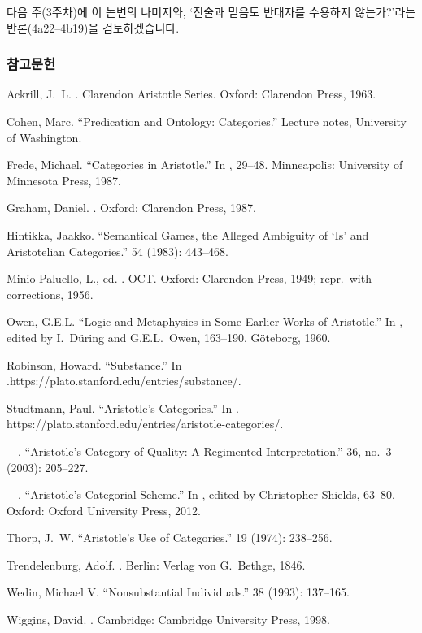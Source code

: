 \documentclass[12pt, a4paper]{article}
\begin{document}
다음 주(3주차)에 이 논변의 나머지와, `진술과 믿음도 반대자를 수용하지 않는가?'라는 반론(4a22--4b19)을 검토하겠습니다.

\begin{references}
\subsubsection*{참고문헌}

 Ackrill, J.\ L. . Clarendon Aristotle Series. Oxford: Clarendon Press, 1963.

 Cohen, Marc. ``Predication and Ontology: Categories.'' Lecture notes, University of Washington.

 Frede, Michael. ``Categories in Aristotle.'' In , 29--48. Minneapolis: University of Minnesota Press, 1987.

 Graham, Daniel. . Oxford: Clarendon Press, 1987.

 Hintikka, Jaakko. ``Semantical Games, the Alleged Ambiguity of `Is' and Aristotelian Categories.''  54 (1983): 443--468.

 Minio-Paluello, L., ed. . OCT. Oxford: Clarendon Press, 1949; repr.\ with corrections, 1956.

 Owen, G.E.L. ``Logic and Metaphysics in Some Earlier Works of Aristotle.'' In , edited by I.\ Düring and G.E.L.\ Owen, 163--190. Göteborg, 1960.

 Robinson, Howard. ``Substance.'' In .\newline https://plato.stanford.edu/entries/substance/.

 Studtmann, Paul. ``Aristotle's Categories.'' In . https://plato.stanford.edu/entries/aristotle-categories/.

 ---. ``Aristotle's Category of Quality: A Regimented Interpretation.''  36, no.\ 3 (2003): 205--227.

 ---. ``Aristotle's Categorial Scheme.'' In , edited by Christopher Shields, 63--80. Oxford: Oxford University Press, 2012.

 Thorp, J.\ W. ``Aristotle's Use of Categories.''  19 (1974): 238--256.

 Trendelenburg, Adolf. . Berlin: Verlag von G.\ Bethge, 1846.

 Wedin, Michael V. ``Nonsubstantial Individuals.''  38 (1993): 137--165.

 Wiggins, David. . Cambridge: Cambridge University Press, 1998.

\end{references}
\end{document}
